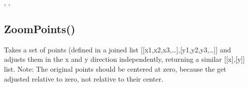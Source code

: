 \documentclass[letterpaper,10pt,english]{sphinxmanual}
\begin{document}
\sphinxAtStartPar
{}

\begin{sphinxVerbatim}[commandchars=\\\{\}]
\end{sphinxVerbatim}

\sphinxAtStartPar
{}

\begin{sphinxVerbatim}[commandchars=\\\{\}]
\PYG{p}{[}\PYG{p}{]}
\PYG{p}{[}\PYG{p}{]}
\PYG{p}{[}\PYG{p}{]}
\end{sphinxVerbatim}

\sphinxAtStartPar
{}

\sphinxAtStartPar
{}, , 

\ignorespaces 

\subsection{ZoomPoints()}
\label{\detokenize{reference/graphics:zoompoints}}\label{\detokenize{reference/graphics:index-20}}
\sphinxAtStartPar
{}

\sphinxAtStartPar
{}

\sphinxAtStartPar
Takes a set of points (defined in a joined list  {[}{[}x1,x2,x3,…{]},{[}y1,y2,y3,…{]}{]} and adjusts them in the x and y direction independently, returning a similar {[}{[}x{]},{[}y{]}{]} list.  Note: The original points should be centered at zero, because the get adjusted relative to zero, not relative to their center.
\end{document}
